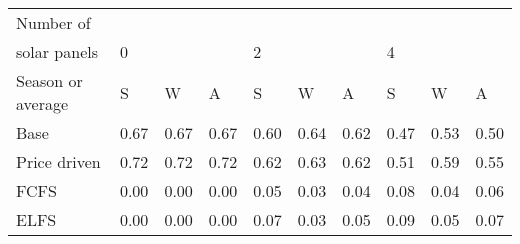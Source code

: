 \begin{table}[h] 
\centering 
\begin{tabular}{l|lll|lll|lll}Number of \\ solar panels&0& & &2& & &4& & \\ \hline 
Season or average & S & W & A & S & W & A & S & W & A \\ \hline 
Base&0.67&0.67&0.67&0.60&0.64&0.62&0.47&0.53&0.50 \\ 
Price driven&0.72&0.72&0.72&0.62&0.63&0.62&0.51&0.59&0.55 \\ 
FCFS&0.00&0.00&0.00&0.05&0.03&0.04&0.08&0.04&0.06 \\ 
ELFS&0.00&0.00&0.00&0.07&0.03&0.05&0.09&0.05&0.07 \\ 
\end{tabular} 
\end{table}
